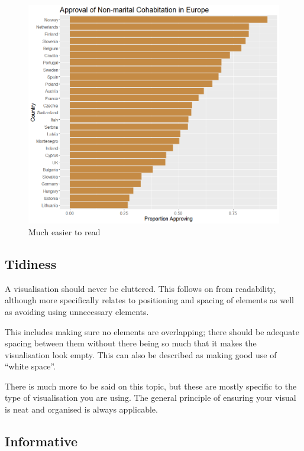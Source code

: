 \documentclass[
  titlepage]{book}
\begin{document}
\begin{figure}
\centering
\includegraphics{img/order restored.png}
\caption{Much easier to read}
\end{figure}

\hypertarget{tidiness}{%
\subsection{Tidiness}\label{tidiness}}

A visualisation should never be cluttered. This follows on from readability, although more specifically relates to positioning and spacing of elements as well as avoiding using unnecessary elements.

This includes making sure no elements are overlapping; there should be adequate spacing between them without there being so much that it makes the visualisation look empty. This can also be described as making good use of ``white space''.

There is much more to be said on this topic, but these are mostly specific to the type of visualisation you are using. The general principle of ensuring your visual is neat and organised is always applicable.

\hypertarget{informative}{%
\subsection{Informative}\label{informative}}
\end{document}
